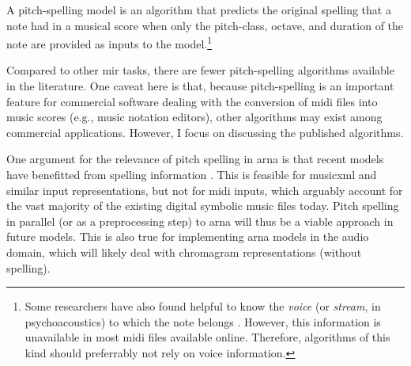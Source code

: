 

A pitch-spelling model is an algorithm that predicts the
original spelling that a note had in a musical score when
only the pitch-class, octave, and duration of the note are
provided as inputs to the model.\footnote{Some researchers
have also found helpful to know the \emph{voice} (or
\emph{stream}, in psychoacoustics) to which the note belongs
\parencite{teodoru2007pitch}. However, this information is
unavailable in most \gls{midi} files available online.
Therefore, algorithms of this kind should preferrably not
rely on voice information.}


Compared to other \gls{mir} tasks, there are fewer
pitch-spelling algorithms available in the literature. One
caveat here is that, because pitch-spelling is an important
feature for commercial software dealing with the conversion
of \gls{midi} files into music scores (e.g., music notation
editors), other algorithms may exist among commercial
applications. However, I focus on discussing the published
algorithms.

One argument for the relevance of pitch spelling in
\gls{arna} is that recent models have benefitted from
spelling information \parencite{micchi2020not}. This is
feasible for \gls{musicxml} and similar input
representations, but not for \gls{midi} inputs, which
arguably account for the vast majority of the existing
digital symbolic music files today. Pitch spelling in
parallel (or as a preprocessing step) to \gls{arna} will
thus be a viable approach in future models. This is also
true for implementing \gls{arna} models in the audio
domain, which will likely deal with chromagram
representations (without spelling).
